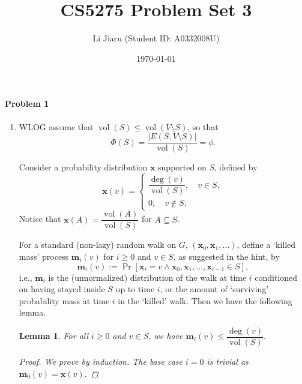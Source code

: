 \documentclass[12pt]{article}
\title{CS5275 Problem Set 3}
\author{Li Jiaru (Student ID: A0332008U)}
\date{\today}
\newtheorem{lemma}{Lemma}
\DeclareMathOperator{\vol}{vol}
\newcommand{\x}{\mathbf{x}}
\newcommand{\m}{\mathbf{m}}
\begin{document}
\maketitle
\paragraph{Problem 1}
\begin{enumerate}[label=\alph*., font=\bfseries]
\item WLOG assume that $\vol(S)\le\vol(V\setminus S)$, so that $$\Phi(S)=\frac{|E(S,V\setminus S)|}{\vol(S)}=\phi.$$

Consider a probability distribution $\x$ supported on $S$, defined by
$$\x(v)=\begin{cases}\dfrac{\deg(v)}{\vol(S)},\quad v\in S,\\0,\quad v\notin S.\end{cases}$$
Notice that $\x(A)=\dfrac{\vol(A)}{\vol(S)}$ for $A\subseteq S$.

For a standard (non-lazy) random walk on $G$, $(\x_0,\x_1,\dots)$, define a `killed mass' process $\m_i(v)$ for $i\ge 0$ and $v\in S$, as suggested in the hint, by
$$\m_i(v):=\Pr\left[\x_i=v\land \x_0,\x_1,\dots,\x_{i-1}\in S\right],$$
i.e., $\m_i$ is the (unnormalized) distribution of the walk at time $i$ conditioned on having stayed inside $S$ up to time $i$, or the amount of   `surviving' probability mass at time $i$ in the `killed' walk. Then we have the following lemma.
\begin{lemma}\label{p1}
For all $i\ge0$ and $v\in S$, we have $\m_i(v)\le\dfrac{\deg(v)}{\vol(S)}.$
\begin{proof}
We prove by induction. The base case $i=0$ is trivial as $\m_0(v)=\x(v)$.


\end{proof}
\end{lemma}
\end{enumerate}
\end{document}
